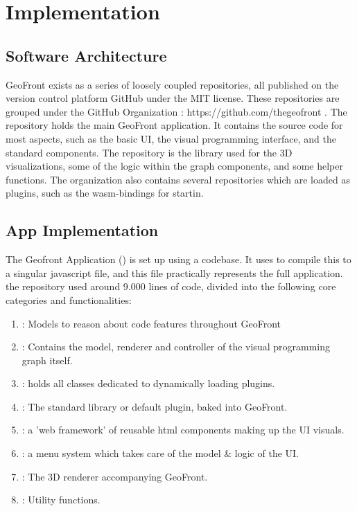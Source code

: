 \chapter{Implementation}%

\section{Software Architecture}
GeoFront exists as a series of loosely coupled repositories, all published on the version control platform GitHub under the MIT license. These repositories are grouped under the GitHub Organization  : https://github.com/thegeofront .
The  repository holds the main GeoFront application. It contains the source code for most aspects, such as the basic UI, the visual programming interface, and the standard components. 
The  repository is the library used for the 3D visualizations, some of the logic within the graph components, and some helper functions.
The  organization also contains several repositories which are loaded as plugins, such as the wasm-bindings for startin.

\section{App Implementation}
The Geofront Application () is set up using a  codebase. It uses  to compile this to a singular javascript file, and this file practically represents the full application. 
the repository used around 9.000 lines of code, divided into the following core categories and functionalities:
\begin{enumerate}[I]
  \item {}: Models to reason about code features throughout GeoFront
  \item {}: Contains the model, renderer and controller of the visual programming graph itself.  
  \item {}: holds all classes dedicated to dynamically loading plugins.
  \item {}: The standard library or default plugin, baked into GeoFront.   
  \item {}: a 'web framework' of reusable html components making up the UI visuals.
  \item {}: a menu system which takes care of the model \& logic of the UI.
  \item {}: The 3D renderer accompanying GeoFront.
  \item {}: Utility functions.   
\end{enumerate}

